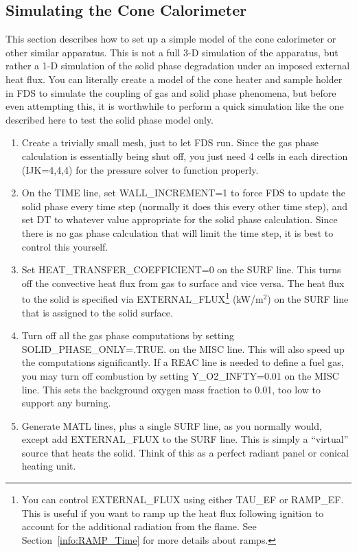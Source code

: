 \documentclass[11pt]{book}
\begin{document}
\subsection{Simulating the Cone Calorimeter}

This section describes how to set up a simple model of the cone calorimeter or other similar apparatus. This is not a full 3-D simulation of the apparatus, but rather a 1-D simulation of the solid phase degradation under an imposed external heat flux. You can literally create a model of the cone heater and sample holder in FDS to simulate the coupling of gas and solid phase phenomena, but before even attempting this, it is worthwhile to perform a quick simulation like the one described here to test the solid phase model only.
\begin{enumerate}
\item Create a trivially small mesh, just to let FDS run. Since the gas phase calculation is essentially being shut off, you just need 4 cells in each direction ({\ct IJK=4,4,4}) for the pressure solver to function properly.
\item On the {\ct TIME} line, set {\ct WALL\_INCREMENT=1} to force FDS to update the solid phase every time step (normally it does this every other time step), and set {\ct DT} to whatever value appropriate for the solid phase calculation. Since there is no gas phase calculation that will limit the time step, it is best to control this yourself.
\item Set {\ct HEAT\_TRANSFER\_COEFFICIENT=0} on the {\ct SURF} line. This turns off the convective heat flux from gas to surface and vice versa. The heat flux to the solid is specified via {\ct EXTERNAL\_FLUX}\footnote{You can control {\ct EXTERNAL\_FLUX} using either {\ct TAU\_EF} or {\ct RAMP\_EF}. This is useful if you want to ramp up the heat flux following ignition to account for the additional radiation from the flame. See Section~\ref{info:RAMP_Time} for more details about ramps.} (kW/m$^2$) on the {\ct SURF} line that is assigned to the solid surface.
\item Turn off all the gas phase computations by setting {\ct SOLID\_PHASE\_ONLY=.TRUE.} on the {\ct MISC} line. This will also speed up the computations significantly. If a {\ct REAC} line is needed to define a fuel gas, you may turn off combustion by setting {\ct Y\_O2\_INFTY=0.01} on the {\ct MISC} line. This sets the background oxygen mass fraction to 0.01, too low to support any burning.
\item Generate {\ct MATL} lines, plus a single {\ct SURF} line, as you normally would, except add {\ct EXTERNAL\_FLUX} to the {\ct SURF} line. This is simply a ``virtual'' source that heats the solid. Think of this as a perfect radiant panel or conical heating unit.

\end{enumerate}
\end{document}
